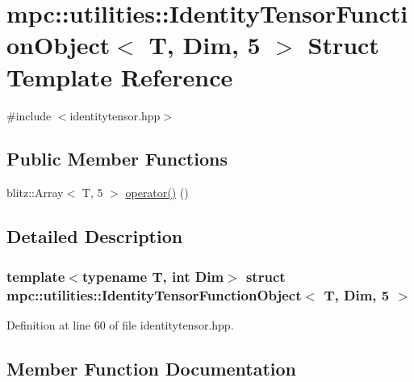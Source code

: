 \hypertarget{structmpc_1_1utilities_1_1_identity_tensor_function_object_3_01_t_00_01_dim_00_015_01_4}{}\section{mpc\+:\+:utilities\+:\+:Identity\+Tensor\+Function\+Object$<$ T, Dim, 5 $>$ Struct Template Reference}
\label{structmpc_1_1utilities_1_1_identity_tensor_function_object_3_01_t_00_01_dim_00_015_01_4}


{\ttfamily \#include $<$identitytensor.\+hpp$>$}

\subsection*{Public Member Functions}
\begin{DoxyCompactItemize}
\item 
blitz\+::\+Array$<$ T, 5 $>$ \mbox{\hyperlink{structmpc_1_1utilities_1_1_identity_tensor_function_object_3_01_t_00_01_dim_00_015_01_4_a2b5b797eb26d2b2deda29dbc49b2ae8b}{operator()}} ()
\end{DoxyCompactItemize}


\subsection{Detailed Description}
\subsubsection*{template$<$typename T, int Dim$>$\newline
struct mpc\+::utilities\+::\+Identity\+Tensor\+Function\+Object$<$ T, Dim, 5 $>$}



Definition at line 60 of file identitytensor.\+hpp.



\subsection{Member Function Documentation}
\mbox{\label{structmpc_1_1utilities_1_1_identity_tensor_function_object_3_01_t_00_01_dim_00_015_01_4_a2b5b797eb26d2b2deda29dbc49b2ae8b}} 
